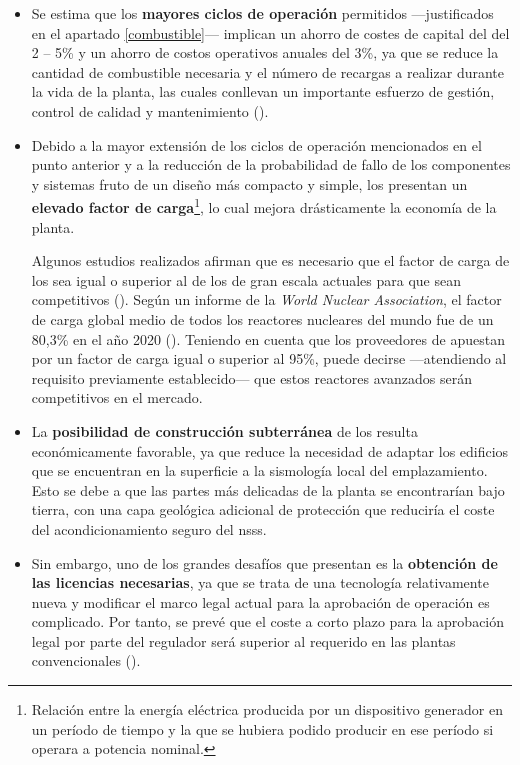 \begin{itemize}
  \item Se estima que los \textbf{mayores ciclos de operación} permitidos ---justificados en el apartado \ref{combustible}--- implican un ahorro de costes de capital del del 2 – 5\% y un ahorro de costos operativos anuales del 3\%, ya que se reduce la cantidad de combustible necesaria y el número de recargas a realizar durante la vida de la planta, las cuales conllevan un importante esfuerzo de gestión, control de calidad y mantenimiento (\cite{overview_smrs}).
  
  \item Debido a la mayor extensión de los ciclos de operación mencionados en el punto anterior y a la reducción de la probabilidad de fallo de los componentes y sistemas fruto de un diseño más compacto y simple, los  presentan un \textbf{elevado \gls{factor de carga}}\footnote{Relación entre la energía eléctrica producida por un dispositivo generador en un período de tiempo y la que se hubiera podido producir en ese período si operara a potencia nominal.}, lo cual mejora drásticamente la economía de la planta. 
  
  Algunos estudios realizados afirman que es necesario que el factor de carga de los  sea igual o superior al de los  de gran escala actuales para que sean competitivos (\cite{SHROPSHIRE2011299}). Según un informe de la \emph{World Nuclear Association}, el factor de carga global medio de todos los reactores nucleares del mundo fue de un 80,3\% en el año 2020 (\cite{wna_report_2021}). Teniendo en cuenta que los proveedores de  apuestan por un factor de carga igual o superior al 95\%, puede decirse ---atendiendo al requisito previamente establecido--- que estos reactores avanzados serán competitivos en el mercado.
  
  \item La \textbf{posibilidad de construcción subterránea} de los  resulta económicamente favorable, ya que reduce la necesidad de adaptar los edificios que se encuentran en la superficie a la sismología local del emplazamiento. Esto se debe a que las partes más delicadas de la planta se encontrarían bajo tierra, con una capa geológica adicional de protección que reduciría el coste del acondicionamiento seguro del \acrshort{nsss}.
  
  \item Sin embargo, uno de los grandes desafíos que presentan es la \textbf{obtención de las licencias necesarias}, ya que se trata de una tecnología relativamente nueva y modificar el marco legal actual para la aprobación de operación es complicado. Por tanto, se prevé que el coste a corto plazo para la aprobación legal por parte del regulador será superior al requerido en las plantas convencionales (\cite{uxc2015historical}).
  
\end{itemize}

